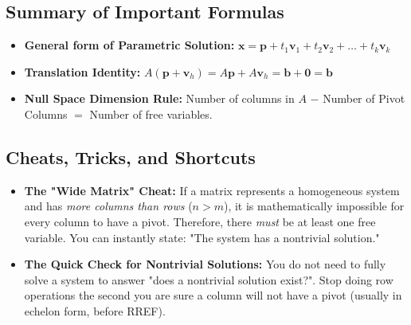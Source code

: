 \documentclass[11pt]{article}
\begin{document}
\subsection*{Summary of Important Formulas}
\begin{itemize}
    \item \textbf{General form of Parametric Solution:} $\mathbf{x} = \mathbf{p} + t_1 \mathbf{v}_1 + t_2 \mathbf{v}_2 + \dots + t_k \mathbf{v}_k$
    \item \textbf{Translation Identity:} $A(\mathbf{p} + \mathbf{v}_h) = A\mathbf{p} + A\mathbf{v}_h = \mathbf{b} + \mathbf{0} = \mathbf{b}$
    \item \textbf{Null Space Dimension Rule:} Number of columns in $A$ $-$ Number of Pivot Columns $=$ Number of free variables.
\end{itemize}

\subsection*{Cheats, Tricks, and Shortcuts}
\begin{itemize}
    \item \textbf{The "Wide Matrix" Cheat:} If a matrix represents a homogeneous system and has \textit{more columns than rows} ($n > m$), it is mathematically impossible for every column to have a pivot. Therefore, there \textit{must} be at least one free variable. You can instantly state: "The system has a nontrivial solution."
    \item \textbf{The Quick Check for Nontrivial Solutions:} You do not need to fully solve a system to answer "does a nontrivial solution exist?". Stop doing row operations the second you are sure a column will not have a pivot (usually in echelon form, before RREF).
\end{itemize}
\end{document}
